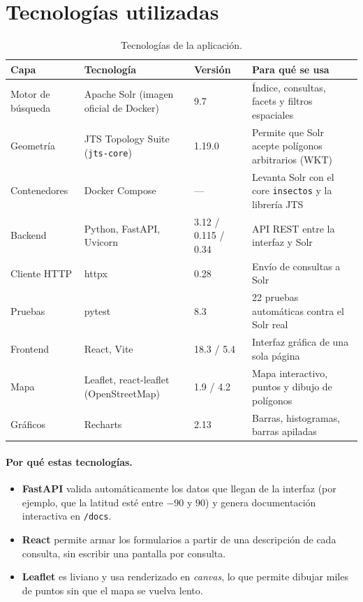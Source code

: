 \documentclass[11pt,a4paper]{article}
\newcommand{\cod}[1]{\texttt{#1}}
\begin{document}


\tableofcontents
\newpage

\section{Tecnologías utilizadas}

\begin{table}[H]
\centering\small
\begin{tabularx}{\textwidth}{@{}lllY@{}}
\toprule
\textbf{Capa} & \textbf{Tecnología} & \textbf{Versión} & \textbf{Para qué se usa} \\
\midrule
Motor de búsqueda & Apache Solr (imagen oficial de Docker) & 9.7 & Índice, consultas, facets y filtros espaciales \\
Geometría & JTS Topology Suite (\cod{jts-core}) & 1.19.0 & Permite que Solr acepte polígonos arbitrarios (WKT) \\
Contenedores & Docker Compose & --- & Levanta Solr con el core \cod{insectos} y la librería JTS \\
Backend & Python, FastAPI, Uvicorn & 3.12 / 0.115 / 0.34 & API REST entre la interfaz y Solr \\
Cliente HTTP & httpx & 0.28 & Envío de consultas a Solr \\
Pruebas & pytest & 8.3 & 22 pruebas automáticas contra el Solr real \\
Frontend & React, Vite & 18.3 / 5.4 & Interfaz gráfica de una sola página \\
Mapa & Leaflet, react-leaflet (OpenStreetMap) & 1.9 / 4.2 & Mapa interactivo, puntos y dibujo de polígonos \\
Gráficos & Recharts & 2.13 & Barras, histogramas, barras apiladas \\
\bottomrule
\end{tabularx}
\caption{Tecnologías de la aplicación.}
\end{table}

\paragraph{Por qué estas tecnologías.}
\begin{itemize}
  \item \textbf{FastAPI} valida automáticamente los datos que llegan de la interfaz
        (por ejemplo, que la latitud esté entre $-90$ y $90$) y genera documentación
        interactiva en \cod{/docs}.
  \item \textbf{React} permite armar los formularios a partir de una descripción de cada
        consulta, sin escribir una pantalla por consulta.
  \item \textbf{Leaflet} es liviano y usa renderizado en \emph{canvas}, lo que permite
        dibujar miles de puntos sin que el mapa se vuelva lento.
\end{itemize}
\end{document}
